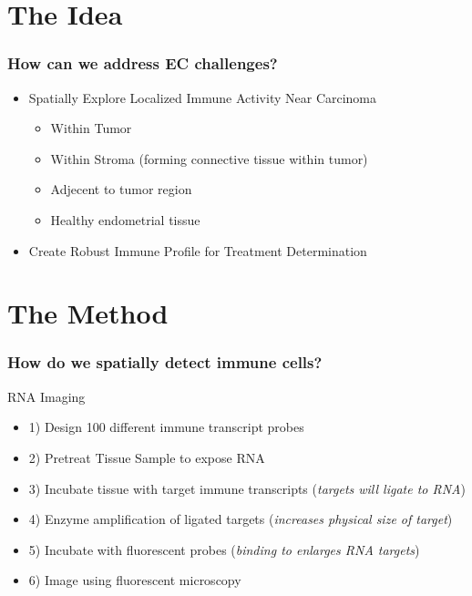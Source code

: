 \documentclass[pdflatex]{beamer}
\begin{document}
\section{The Idea}

\begin{frame}
 \frametitle{How can we address EC challenges?}
\begin{itemize}
\item Spatially Explore Localized Immune Activity Near Carcinoma
  \begin{itemize}
  \item Within Tumor
  \item Within Stroma (forming connective tissue within tumor)
  \item Adjecent to tumor region
  \item Healthy endometrial tissue
  \end{itemize}
\item Create Robust Immune Profile for Treatment Determination
\end{itemize}

\end{frame}

\section{The Method}

\begin{frame}
 \frametitle{How do we spatially detect immune cells?}
 RNA Imaging \pause
\begin{itemize}
\item 1) Design 100 different immune transcript probes
\item 2) Pretreat Tissue Sample to expose RNA
\item 3) Incubate tissue with target immune transcripts ({\it targets will ligate to RNA})
\item 4) Enzyme amplification of ligated targets ({\it increases physical size of target})
\item 5) Incubate with fluorescent probes ({\it binding to enlarges RNA targets})
\item 6) Image using fluorescent microscopy
\end{itemize}

\end{frame}
\end{document}
